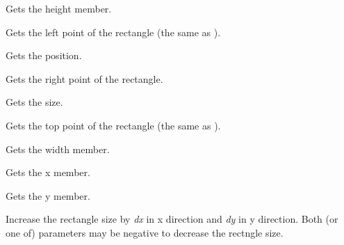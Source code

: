 \label{wxrectgetheight}


Gets the height member.

\label{wxrectgetleft}


Gets the left point of the rectangle (the same as ).

\label{wxrectgetposition}


Gets the position.

\label{wxrectgetright}


Gets the right point of the rectangle.

\label{wxrectgetsize}


Gets the size.

\label{wxrectgettop}


Gets the top point of the rectangle (the same as ).

\label{wxrectgetwidth}


Gets the width member.

\label{wxrectgetx}


Gets the x member.

\label{wxrectgety}


Gets the y member.

\label{wxrectinflate}



Increase the rectangle size by {\it dx} in x direction and {\it dy} in y
direction. Both (or one of) parameters may be negative to decrease the
rectngle size.

